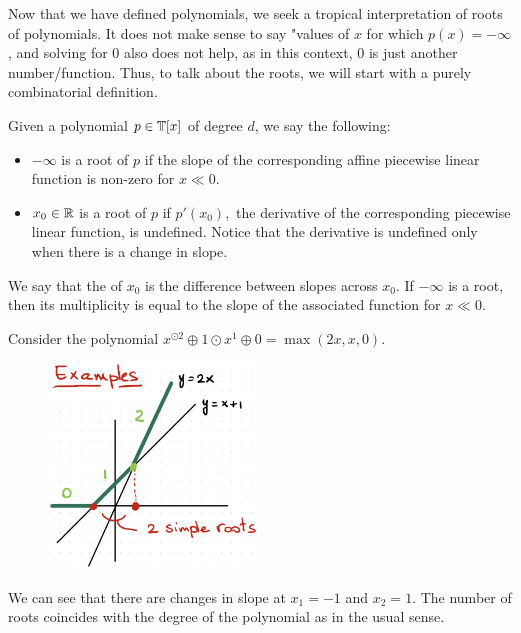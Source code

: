 \documentclass[12pt]{memoir}
\theoremstyle{definition}
\begin{document}
Now that we have defined polynomials, we seek a tropical interpretation of roots of polynomials. It does not make sense to say "values of $x$ for which $p(x)= - \infty$, and solving for $0$ also does not help, as in this context, $0$ is just another number/function. Thus, to talk about the roots, we will start with a purely combinatorial definition. 

\begin{Def}
    Given a polynomial $p\in\mathbb{T}[x]$ of degree $d$, we say the following:
    \begin{itemize}
        \item $-\infty$ is a root of $p$ if the slope of the corresponding affine piecewise linear function is non-zero for $x\ll 0$.
        \item $x_0\in\mathbb{R}$ is a root of $p$ if $p'(x_0),$ the derivative of the corresponding piecewise linear function, is undefined. Notice that the derivative is undefined only when there is a change in slope.
    \end{itemize}
    We say that the  of $x_0$ is the difference between slopes across $x_0$. If $-\infty$ is a root, then its multiplicity is equal to the slope of the associated function for $x\ll 0$.
\end{Def}

\begin{Ex}
    Consider the polynomial $x^{\odot2}\oplus1\odot x^1\oplus 0=\max(2x,x,0)$.
    \begin{figure}[h!]
        \centering
        \includegraphics[width=0.5\textwidth]{figs/fig3-3SimpleFiniteRootsTropicalPolynomial.png}
        \label{fig:3.3-SimpleFiniteRoots}
    \end{figure}
    
    We can see that there are changes in slope at $x_1=-1$ and $x_2=1$. The number of roots coincides with the degree of the polynomial as in the usual sense.
\end{Ex}
\end{document}
